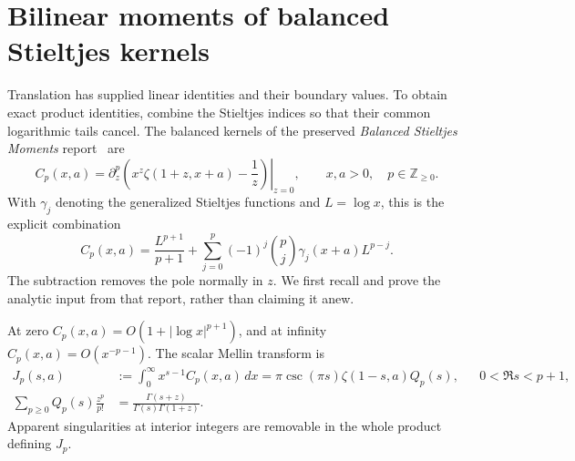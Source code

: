 \section{Bilinear moments of balanced Stieltjes kernels}\label{stbil:sec}

Translation has supplied linear identities and their boundary values.
To obtain exact product identities, combine the Stieltjes indices so that
their common logarithmic tails cancel. The balanced kernels of the
preserved \emph{Balanced Stieltjes Moments} report~\cite{stmell:balanced} are
\begin{equation}\label{stbil:kernel}
 C_p(x,a)=\left.\partial_z^p\left(x^z\zeta(1+z,x+a)-\frac1z\right)
 \right|_{z=0},\qquad x,a>0,\quad p\in\mathbb Z_{\geq0}.
\end{equation}
With $\gamma_j$ denoting the generalized Stieltjes functions and
$L=\log x$, this is the explicit combination
\[
 C_p(x,a)=\frac{L^{p+1}}{p+1}
       +\sum_{j=0}^p(-1)^j\binom pj\gamma_j(x+a)L^{p-j}.
\]
The subtraction removes the pole normally in $z$.  We first recall and
prove the analytic input from that report, rather than claiming it anew.

\begin{lemma}\label{stbil:scalar}
At zero $C_p(x,a)=O(1+|\log x|^{p+1})$, and at infinity
$C_p(x,a)=O(x^{-p-1})$.  The scalar Mellin transform is
\begin{align*}
 J_p(s,a)&:=\int_0^\infty x^{s-1}C_p(x,a)\,dx
       =\pi\csc(\pi s)\zeta(1-s,a)Q_p(s),
       &&0<\Re s<p+1,\\
 \sum_{p\geq0}Q_p(s)\frac{z^p}{p!}
       &=\frac{\Gamma(s+z)}{\Gamma(s)\Gamma(1+z)}.
\end{align*}
Apparent singularities at interior integers are removable in the whole
product defining $J_p$.
\end{lemma}

